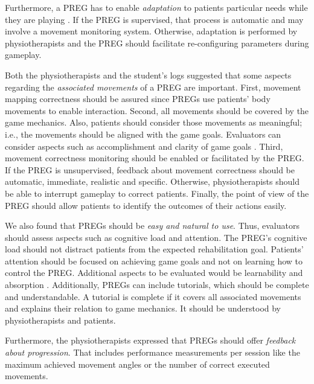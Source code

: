 Furthermore, a \ac{PREG} has to enable \textit{adaptation} to patients particular needs while they are playing \autocite{Cameirao2010,Ni2014,Nijholt2008,Wiemeyer2015}. If the \ac{PREG} is supervised, that process is automatic and may involve a movement monitoring system. Otherwise, adaptation is performed by physiotherapists and the \ac{PREG} should facilitate re-configuring parameters during gameplay.

Both the physiotherapists and the student's logs suggested that some aspects regarding the \textit{associated movements} of a \ac{PREG} are important. First, movement mapping correctness should be assured since \acp{PREG} use patients' body movements to enable interaction. Second, all movements should be covered by the game mechanics. Also, patients should consider those movements as meaningful; i.e., the movements should be aligned with the game goals. Evaluators can consider aspects such as accomplishment \autocite{Cameirao2010,Zhao2016} and clarity of game goals \autocite{Desurvire2009,VandenAbeele2016}. Third, movement correctness monitoring should be enabled or facilitated by the \ac{PREG}. If the \ac{PREG} is unsupervised, feedback about movement correctness should be automatic, immediate, realistic and specific. Otherwise, physiotherapists should be able to interrupt gameplay to correct patients. Finally, the point of view of the \ac{PREG} should allow patients to identify the outcomes of their actions easily.

We also found that \acp{PREG} should be \textit{easy and natural to use}. Thus, evaluators should assess aspects such as cognitive load and attention. The \ac{PREG}’s cognitive load should not distract patients from the expected rehabilitation goal. Patients’ attention should be focused on achieving game goals and not on learning how to control the \ac{PREG}. Additional aspects to be evaluated would be learnability \autocite{Desurvire2009,GonzalezSanchez2009} and absorption \autocite{Lapas2015}. Additionally, \acp{PREG} can include tutorials, which should be complete and understandable. A tutorial is complete if it covers all associated movements and explains their relation to game mechanics. It should be understood by physiotherapists and patients.

Furthermore, the physiotherapists expressed that \acp{PREG} should offer \textit{feedback about progression}. That includes performance measurements per session like the maximum achieved movement angles or the number of correct executed movements.

